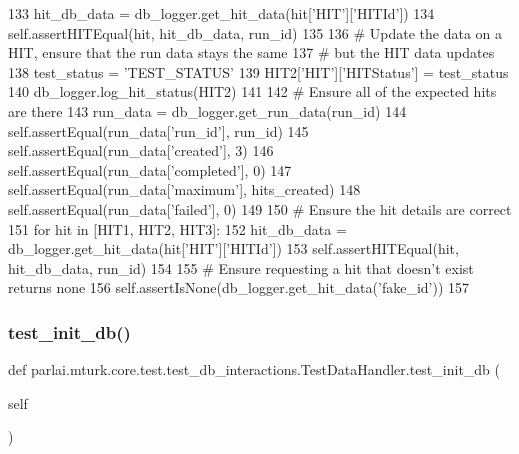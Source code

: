 \begin{DoxyCode}
133             hit\_db\_data = db\_logger.get\_hit\_data(hit[\textcolor{stringliteral}{'HIT'}][\textcolor{stringliteral}{'HITId'}])
134             self.assertHITEqual(hit, hit\_db\_data, run\_id)
135 
136         \textcolor{comment}{# Update the data on a HIT, ensure that the run data stays the same}
137         \textcolor{comment}{# but the HIT data updates}
138         test\_status = \textcolor{stringliteral}{'TEST\_STATUS'}
139         HIT2[\textcolor{stringliteral}{'HIT'}][\textcolor{stringliteral}{'HITStatus'}] = test\_status
140         db\_logger.log\_hit\_status(HIT2)
141 
142         \textcolor{comment}{# Ensure all of the expected hits are there}
143         run\_data = db\_logger.get\_run\_data(run\_id)
144         self.assertEqual(run\_data[\textcolor{stringliteral}{'run\_id'}], run\_id)
145         self.assertEqual(run\_data[\textcolor{stringliteral}{'created'}], 3)
146         self.assertEqual(run\_data[\textcolor{stringliteral}{'completed'}], 0)
147         self.assertEqual(run\_data[\textcolor{stringliteral}{'maximum'}], hits\_created)
148         self.assertEqual(run\_data[\textcolor{stringliteral}{'failed'}], 0)
149 
150         \textcolor{comment}{# Ensure the hit details are correct}
151         \textcolor{keywordflow}{for} hit \textcolor{keywordflow}{in} [HIT1, HIT2, HIT3]:
152             hit\_db\_data = db\_logger.get\_hit\_data(hit[\textcolor{stringliteral}{'HIT'}][\textcolor{stringliteral}{'HITId'}])
153             self.assertHITEqual(hit, hit\_db\_data, run\_id)
154 
155         \textcolor{comment}{# Ensure requesting a hit that doesn't exist returns none}
156         self.assertIsNone(db\_logger.get\_hit\_data(\textcolor{stringliteral}{'fake\_id'}))
157 
\end{DoxyCode}
\mbox{\label{classparlai_1_1mturk_1_1core_1_1test_1_1test__db__interactions_1_1TestDataHandler_a8fcba0662ee9a0b8d74287e984a86c39}} 
\subsubsection{\texorpdfstring{test\+\_\+init\+\_\+db()}{test\_init\_db()}}
{\footnotesize\ttfamily def parlai.\+mturk.\+core.\+test.\+test\+\_\+db\+\_\+interactions.\+Test\+Data\+Handler.\+test\+\_\+init\+\_\+db (\begin{DoxyParamCaption}\item[{}]{self }\end{DoxyParamCaption})}



